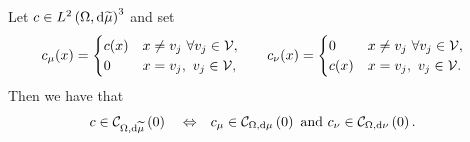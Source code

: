 \begin{prop} \label{prop:ThickVertexCurlZeroCharacterisation}
	Let $c\in L^{2}\left( \Omega,\mathrm{d}\widetilde{\mu} \right)^3$ and set
	\begin{align*}
		c_{\mu}(x) = \begin{cases} c(x) & x\neq v_j \ \forall v_j\in\mathcal{V}, \\ 0 & x=v_j, \ v_j\in\mathcal{V}, \end{cases} 
		&\qquad
		c_{\nu}(x) = \begin{cases} 0 & x\neq v_j \ \forall v_j\in\mathcal{V}, \\ c(x) & x=v_j, \ v_j\in\mathcal{V}. \end{cases}
	\end{align*}		
	Then we have that
	\begin{align*}
		c\in\mathcal{C}_{ \Omega, \mathrm{d}\widetilde{\mu}}\left( 0 \right) \quad\Leftrightarrow\quad 
		& c_{\mu}\in\mathcal{C}_{ \Omega, \mathrm{d}\mu}\left( 0 \right) \text{ and } c_{\nu}\in\mathcal{C}_{ \Omega, \mathrm{d}\nu}\left( 0 \right).
	\end{align*}
\end{prop}

